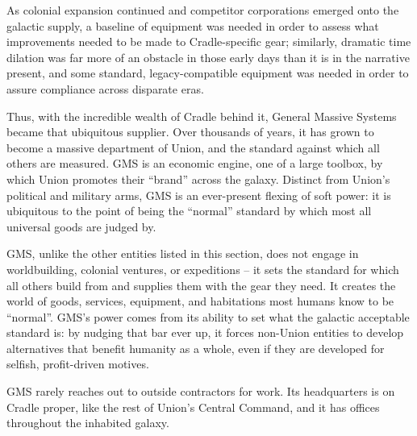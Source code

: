 As colonial expansion continued and competitor corporations emerged onto the galactic supply, a
baseline of equipment was needed in order to assess what improvements needed to be made to
Cradle-specific gear; similarly, dramatic time dilation was far more of an obstacle in those early
days than it is in the narrative present, and some standard, legacy-compatible equipment was
needed in order to assure compliance across disparate eras.

Thus, with the incredible wealth of Cradle behind it, General Massive Systems became that
ubiquitous supplier. Over thousands of years, it has grown to become a massive department of
Union, and the standard against which all others are measured. GMS is an economic engine, one
of a large toolbox, by which Union promotes their ``brand'' across the galaxy. Distinct from Union's
political and military arms, GMS is an ever-present flexing of soft power: it is ubiquitous to the
point of being the ``normal'' standard by which most all universal goods are judged by.

GMS, unlike the other entities listed in this section, does not engage in worldbuilding, colonial
ventures, or expeditions -- it sets the standard for which all others build from and supplies them
with the gear they need. It creates the world of goods, services, equipment, and habitations most
humans know to be ``normal''. GMS's power comes from its ability to set what the galactic
acceptable standard is: by nudging that bar ever up, it forces non-Union entities to develop
alternatives that benefit humanity as a whole, even if they are developed for selfish, profit-driven
motives.

GMS rarely reaches out to outside contractors for work. Its headquarters is on Cradle proper, like
the rest of Union's Central Command, and it has offices throughout the inhabited galaxy.


